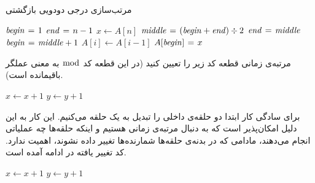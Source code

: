 {\begin{algorithm}
\caption{مرتب‌سازی درجی دودویی بازگشتی}\label{ch1:alg:recurBinInsSort}
\begin{latin}
\begin{algorithmic}[1]
				\State	\Return
		\Else
				\State	{}
				\State	$\mathit{begin} \mathrel{\hspace{1pt}=\hspace{1pt}} 1$		
				\State	$\mathit{end} \mathrel{\hspace{1pt}=\hspace{1pt}} n-1$		
%
				\State	$x \gets A[n]$
						\State	$\mathit{middle} \mathrel{\hspace{1pt}=\hspace{1pt}} (\mathit{begin} + \mathit{end}) \div 2$
								\State	$\mathit{end} \mathrel{\hspace{1pt}=\hspace{1pt}} \mathit{middle}$						
						\Else
								\State	$\mathit{begin} \mathrel{\hspace{1pt}=\hspace{1pt}} \mathit{middle} + 1$		
						\EndIf
				\EndWhile
						\State	$A[i] \gets A[i-1]$
				\EndFor
				\State	$A[\mathit{begin}] \mathrel{\hspace{1pt}=\hspace{1pt}} x$				
		\EndIf
\EndProcedure
\end{algorithmic}
\end{latin}
\end{algorithm}

 مرتبه‌ی زمانی قطعه کد زیر را تعیین کنید (در این قطعه کد {$\bmod$} به معنی عملگر باقیمانده است).

\begin{latin}
\begin{algorithmic}[1]
								\State	$x \gets x+1$
						\EndFor
								\State	$y \gets y+1$							
						\EndFor
				\EndIf
		\EndFor
\end{algorithmic}
\end{latin}


برای سادگی کار ابتدا دو حلقه‌‌ی داخلی را تبدیل به یک حلقه می‌کنیم. این کار به این دلیل امکان‌پذیر است که به دنبال مرتبه‌ی زمانی هستیم و اینکه حلقه‌ها چه عملیاتی انجام می‌دهند، مادامی که در بدنه‌ی حلقه‌ها شمارنده‌ها تغییر داده نشوند، اهمیت ندارد. کد تغییر یافته در ادامه آمده است.

\begin{latin}
\begin{algorithmic}[1]
								\State	$x \gets x+1$
								\State	$y \gets y+1$		
						\EndFor
				\EndIf
		\EndFor
\end{algorithmic}
\end{latin}

}
